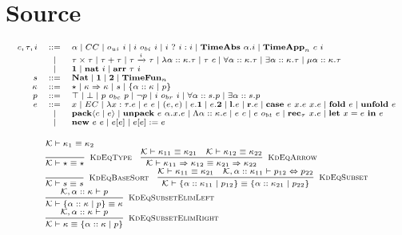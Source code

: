\documentclass[fleqn]{article}
\begin{document}
\section{Source}

\[
\scriptsize
\begin{array}{rcl}
    c,\tau,i & ::= & \alpha \mid CC \mid o_{ui}~i \mid i~o_{bi}~i \mid i~?~i:i \mid \mathbf{TimeAbs}~\alpha. i \mid \mathbf{TimeApp}_n~c~i \\
    & \mid & \tau \times \tau \mid \tau + \tau \mid \tau \xrightarrow{i} \tau \mid \lambda \alpha :: \kappa. \tau \mid \tau~c \mid \forall \alpha :: \kappa. \tau \mid \exists \alpha :: \kappa. \tau \mid \mu \alpha :: \kappa. \tau \\
    & \mid & \mathbf{1} \mid \mathbf{nat}~i \mid \mathbf{arr}~\tau~i \\
    s & ::= & \mathbf{Nat} \mid \mathbf{1} \mid \mathbf{2} \mid \mathbf{TimeFun}_n \\
    \kappa & ::= & \star \mid \kappa \Rightarrow \kappa \mid s \mid \{ \alpha :: \kappa \mid p \} \\
    p & ::= & \top \mid \bot \mid p~o_{bc}~p \mid \neg p \mid i~o_{br}~i \mid \forall \alpha :: s. p \mid \exists \alpha :: s. p \\
    e & ::= & x \mid EC \mid \lambda x:\tau. e \mid e~e \mid (e,e) \mid e.\mathbf{1} \mid e.\mathbf{2} \mid \mathbf{l}.e \mid \mathbf{r}.e \mid \mathbf{case}~e~x.e~x.e \mid \mathbf{fold}~e \mid \mathbf{unfold}~e \\
    & \mid & \mathbf{pack}\langle c \mid e \rangle \mid \mathbf{unpack}~e~\alpha.x.e \mid \Lambda \alpha :: \kappa. e \mid e~c \mid e~o_{bt}~e \mid \mathbf{rec}_\tau~x.e \mid \mathbf{let}~x=e~\mathbf{in}~e \\
    & \mid & \mathbf{new}~e~e \mid e[e] \mid e[e] := e
\end{array}
\]

\[
\scriptsize
\begin{array}{l}
    \mathcal{K} \vdash \kappa_1 \equiv \kappa_2 \\
    \infer[\textsc{KdEqType}]{\mathcal{K} \vdash \star \equiv \star}{} \hspace{1em}
    \infer[\textsc{KdEqArrow}]{\mathcal{K} \vdash \kappa_{11} \Rightarrow \kappa_{12} \equiv \kappa_{21} \Rightarrow \kappa_{22}}{\mathcal{K} \vdash \kappa_{11} \equiv \kappa_{21} & \mathcal{K} \vdash \kappa_{12} \equiv \kappa_{22}} \\
    \infer[\textsc{KdEqBaseSort}]{\mathcal{K} \vdash s \equiv s}{} \hspace{1em}
    \infer[\textsc{KdEqSubset}]{\mathcal{K} \vdash \{ \alpha :: \kappa_{11} \mid p_{12} \} \equiv \{ \alpha :: \kappa_{21} \mid p_{22} \}}{\mathcal{K} \vdash \kappa_{11} \equiv \kappa_{21} & \mathcal{K}, \alpha :: \kappa_{11} \vdash p_{12} \Leftrightarrow p_{22}} \\
    \infer[\textsc{KdEqSubsetElimLeft}]{\mathcal{K} \vdash \{ \alpha :: \kappa \mid p \} \equiv \kappa}{\mathcal{K},\alpha :: \kappa \vdash p} \\
    \infer[\textsc{KdEqSubsetElimRight}]{\mathcal{K} \vdash \kappa \equiv \{ \alpha :: \kappa \mid p \}}{\mathcal{K},\alpha :: \kappa \vdash p}
\end{array}
\]
\end{document}

